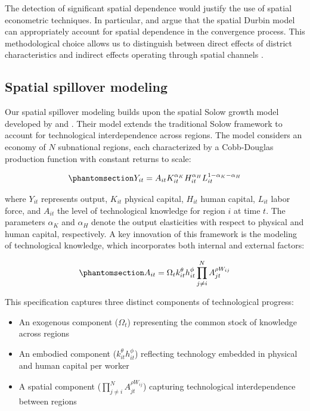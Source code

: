 \documentclass[
  a4paper, 
  twoside,
  review
]{article}
\providecommand{\tightlist}{%
  \setlength{\itemsep}{0pt}\setlength{\parskip}{0pt}}
\begin{document}
The detection of significant spatial dependence would justify the use of
spatial econometric techniques. In particular,
\citet{ertur_koch_spatial_growth} and \citet{fischer_spatial_mrw} argue
that the spatial Durbin model can appropriately account for spatial
dependence in the convergence process. This methodological choice allows
us to distinguish between direct effects of district characteristics and
indirect effects operating through spatial channels
\citep{lesage_pace_spatial_econometrics}.

\subsection{Spatial spillover
modeling}\label{spatial-spillover-modeling}

Our spatial spillover modeling builds upon the spatial Solow growth
model developed by \citet{ertur_koch_spatial_growth} and
\citet{fischer_spatial_mrw}. Their model extends the traditional Solow
framework to account for technological interdependence across regions.
The model considers an economy of \(N\) subnational regions, each
characterized by a Cobb-Douglas production function with constant
returns to scale:

\begin{equation}\phantomsection\label{eq-production}{
Y_{i t}=A_{i t} K_{i t}^{\alpha_{K}} H_{i t}^{\alpha_{H}} L_{i t}^{1-\alpha_{K} -\alpha_{H}}
}\end{equation}

where \(Y_{it}\) represents output, \(K_{it}\) physical capital,
\(H_{it}\) human capital, \(L_{it}\) labor force, and \(A_{it}\) the
level of technological knowledge for region \(i\) at time \(t\). The
parameters \(\alpha_K\) and \(\alpha_H\) denote the output elasticities
with respect to physical and human capital, respectively. A key
innovation of this framework is the modeling of technological knowledge,
which incorporates both internal and external factors:

\begin{equation}\phantomsection\label{eq-technology}{
A_{i t}=\Omega_{t} k_{i t}^{\theta} h_{i t}^{\phi} \prod_{j \neq i}^{N} A_{j t}^{\rho W_{i j}}
}\end{equation}

This specification captures three distinct components of technological
progress:

\begin{itemize}
\tightlist
\item
  An exogenous component (\(\Omega_t\)) representing the common stock of
  knowledge across regions
\item
  An embodied component (\(k_{i t}^{\theta} h_{i t}^{\phi}\)) reflecting
  technology embedded in physical and human capital per worker
\item
  A spatial component (\(\prod_{j \neq i}^{N} A_{j t}^{\rho W_{i j}}\))
  capturing technological interdependence between regions
\end{itemize}
\end{document}
